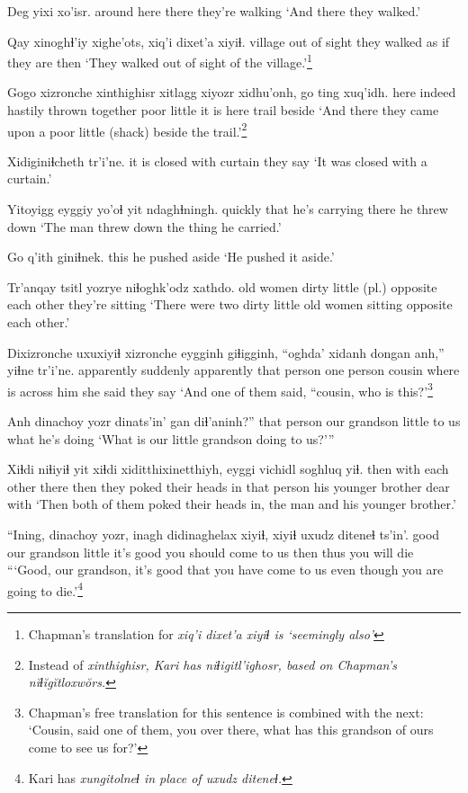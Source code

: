 \documentclass[12pt]{article}
\begin{document}
\gll Deg yixi xo'isr.
{around here} there {they're walking}
\glt `And there they walked.'
\glend

\gll Qay xinoghɬ'iy xighe'ots, xiq'i dixet'a xiyiɬ.
village {out of sight} {they walked} {as if} {they are} then
\glt `They walked out of sight of the village.'\footnote{Chapman's translation for \em xiq'i dixet'a xiyiɬ \em is `seemingly also'}
\glend

\gll Gogo xizronche  xinthighisr  xitlagg xiyozr xidhu'onh, go ting xuq'idh.
here indeed   {hastily thrown together} poor  little  {it is} here trail beside
\glt `And there they came upon a poor little (shack) beside the trail.'\footnote{Instead of \em xinthighisr, \em Kari has \em niɬigitl'ighosr, \em based on Chapman's \em n\u{i}ɬ\u{i}g\u{i}tloxw\u{o}rs.}
\glend

\gll Xidiginiɬcheth  tr'i'ne.
{it is closed with curtain} {they say}
\glt `It was closed with a curtain.'
\glend

\gll Yitoyigg eyggiy yo'oɬ  yit ndaghɬningh.
quickly that  {he's carrying} there {he threw down}
\glt `The man threw down the thing he carried.'
\glend

\gll Go {q'ith giniɬnek.}
this {he pushed aside}
\glt `He pushed it aside.'
\glend

\gll Tr'anqay tsitl yozrye niɬoghk'odz  xathdo.
{old women} dirty {little (pl.)} {opposite each other} {they're sitting}
\glt `There were two dirty little old women sitting opposite each other.'
\glend

\gll Dixizronche uxuxiyiɬ xizronche eygginh giɬigginh, ``oghda' xidanh dongan anh,'' yiɬne  tr'i'ne.
apparently  suddenly apparently {that person} {one person} cousin  {where is} across  him {she said} {they say}
\glt `And one of them said, ``cousin, who is this?'\footnote{Chapman's free translation for this sentence is combined with the next:  `Cousin, said one of them, you over there, what has this grandson of ours come to see us for?'}
\glend

\gll Anh dinachoy yozr  dinats'in' gan diɬ'aninh?''
{that person} {our grandson} little  {to us}  what {he's doing}
\glt `What is our little grandson doing to us?'''
\glend

\gll Xiɬdi niɬiyiɬ yit xiɬdi xiditthixinetthiyh, eyggi vichidl  soghluq yiɬ.
then {with each other} there then {they poked their heads in} {that person} {his younger brother} dear  with
\glt `Then both of them poked their heads in, the man and his younger brother.'
\glend

\gll ``Ining, dinachoy yozr, inagh didinaghelax  xiyiɬ, xiyiɬ uxudz diteneɬ ts'in'.
good  {our grandson} little {it's good}  {you should come to us} then thus {you will die}
\glt ```Good, our grandson, it's good that you have come to us even though you are going to die.'\footnote{Kari has \em xungitolneɬ \em in place of \em uxudz diteneɬ.}
\glend
\end{document}
